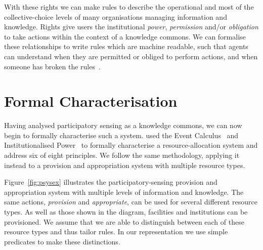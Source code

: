 With these rights we can make rules to describe the operational and most of the collective-choice levels of many organisations managing information and knowledge. Rights give users the institutional \emph{power}, \emph{permission} and/or \emph{obligation} to take actions within the context of a knowledge commons. We can formalise these relationships to write rules which are machine readable, such that agents can understand when they are permitted or obliged to perform actions, and when someone has broken the rules~\citep{Artikis2009}.



\section{Formal Characterisation}\label{sec:formalchar}

Having analysed participatory sensing as a knowledge commons, we can now begin to formally characterise such a system.  used the Event Calculus~\citep{Kowalski1986} and Institutionalised Power~\citep{Jones1996} to formally characterise a resource-allocation system and address six of  eight principles. We follow the same methodology, applying it instead to a provision and appropriation system with multiple resource types.

Figure~\ref{fig:psysex} illustrates the participatory-sensing provision and appropriation system with multiple levels of information and knowledge. 
The same actions, \emph{provision} and \emph{appropriate}, can be used for several different resource types. 
As well as those shown in the diagram, facilities and institutions can be provisioned. 
We assume that we are able to distinguish between each of these resource types and thus tailor rules. In our representation we use simple predicates to make these distinctions.


